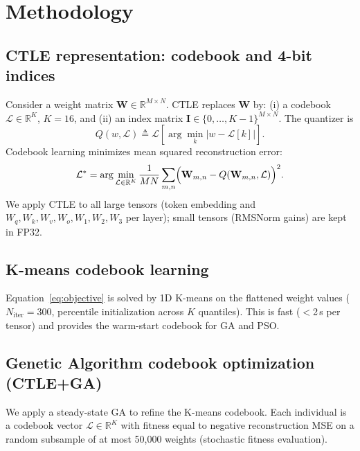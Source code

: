 \documentclass[lettersize,journal]{IEEEtran}
\begin{document}
\section{Methodology}
\label{sec:methodology}

\subsection{CTLE representation: codebook and 4-bit indices}
\label{subsec:representation}

Consider a weight matrix $\mathbf{W}\in\mathbb{R}^{M\times N}$.
CTLE replaces $\mathbf{W}$ by:
(i) a codebook $\mathcal{L}\in\mathbb{R}^{K}$, $K=16$, and
(ii) an index matrix $\mathbf{I}\in\{0,\dots,K-1\}^{M\times N}$.
The quantizer is
\begin{equation}
Q(w,\mathcal{L}) \triangleq
\mathcal{L}\!\left[\arg\min_{k} |w - \mathcal{L}[k]|\right].
\label{eq:quantizer}
\end{equation}
Codebook learning minimizes mean squared reconstruction error:
\begin{equation}
\mathcal{L}^{*}=\arg\min_{\mathcal{L}\in\mathbb{R}^{K}}
\frac{1}{MN}\sum_{m,n}\Bigl(\mathbf{W}_{m,n}-Q(\mathbf{W}_{m,n},\mathcal{L})\Bigr)^2.
\label{eq:objective}
\end{equation}
We apply CTLE to all large tensors (token embedding and $W_q,W_k,W_v,W_o,
W_1,W_2,W_3$ per layer); small tensors (RMSNorm gains) are kept in FP32.

\subsection{K-means codebook learning}
\label{subsec:kmeans}

Equation~\eqref{eq:objective} is solved by 1D K-means on the flattened weight
values ($N_\mathrm{iter}=300$, percentile initialization across $K$ quantiles).
This is fast ($<$2\,s per tensor) and provides the warm-start codebook for GA
and PSO.

\subsection{Genetic Algorithm codebook optimization (CTLE+GA)}
\label{subsec:ga}

We apply a steady-state GA to refine the K-means codebook.
Each individual is a codebook vector $\mathcal{L}\in\mathbb{R}^K$ with fitness
equal to negative reconstruction MSE on a random subsample of at most
50{,}000 weights (stochastic fitness evaluation).
\end{document}
